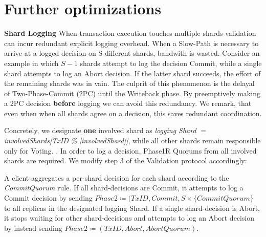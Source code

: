 \section{Further optimizations}


\par \textbf{Shard Logging} When transaction execution touches multiple shards validation can incur redundant explicit logging overhead. When a Slow-Path is necessary to arrive at a logged decision on S different shards, bandwith is wasted. Consider an example in which $S-1$ shards attempt to log the decision Commit, while a single shard attempts to log an Abort decision. If the latter shard succeeds, the effort of the remaining shards was in vain. 
The culprit of this phenomenon is the delayal of Two-Phase-Commit (2PC) until the Writeback phase. By preemptively making a 2PC decision \textbf{before} logging we can avoid this redundancy. We remark, that even when when all shards agree on a decision, this saves redundant coordination. 

Concretely, we designate \textbf{one} involved shard as \textit{logging Shard} $=$ \textit{involvedShards[TxID \% |involvedShard|]}, while all other shards remain responsible only for Voting. .  In order to log a decision, Phase1R Quorums  from all involved shards are required. We modify step 3 of the Validation protocol accordingly:

A client aggregates a per-shard decision for each shard according to the \textit{CommitQuorum} rule. If all shard-decisions are Commit, it attempts to log a Commit decision by sending $Phase2 \coloneqq (TxID, Commit, S \times \{CommitQuorum\}$ to all replicas in the designated logging Shard. If a single shard-decision is Abort, it stops waiting for other shard-decisions and attempts to log an Abort decision by instead sending $Phase2 \coloneqq (TxID, Abort, AbortQuorum)$. 

